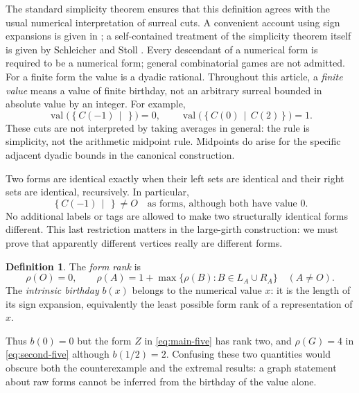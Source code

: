 \documentclass[11pt,a4paper]{article}
\numberwithin{equation}{section}
\theoremstyle{definition}
\newtheorem{definition}[theorem]{Definition}
\theoremstyle{remark}
\newcommand{\val}{\operatorname{val}}
\newcommand{\rk}{\rho}
\newcommand{\cut}[2]{\left\{#1\,\middle|\,#2\right\}}
\newcommand{\can}{C}
\begin{document}
The standard simplicity theorem ensures that this definition agrees with the
usual numerical interpretation of surreal cuts. A convenient account using
sign expansions is given in \cite[Sections~2--3]{Berarducci2020}; a self-contained
treatment of the simplicity theorem itself is given by Schleicher and Stoll
\cite[Section~5.1]{SchleicherStoll}. Every descendant of a numerical form is
required to be a numerical form; general combinatorial games are not admitted.
For a finite form the value is a dyadic rational. Throughout this article, a \emph{finite
value} means a value of finite birthday, not an arbitrary surreal bounded in
absolute value by an integer. For example,
\begin{equation}
 \val\bigl(\cut{\can(-1)}{}\bigr)=0,
 \qquad
 \val\bigl(\cut{\can(0)}{\can(2)}\bigr)=1.
\end{equation}
These cuts are not interpreted by taking averages in general: the rule is
simplicity, not the arithmetic midpoint rule. Midpoints do arise for the
specific adjacent dyadic bounds in the canonical construction.

Two forms are identical exactly when their left sets are identical and their
right sets are identical, recursively. In particular,
\begin{equation}
 \cut{\can(-1)}{}\ne O
 \quad\text{as forms, although both have value }0.
\end{equation}
No additional labels or tags are allowed to make two structurally identical
forms different. This last restriction matters in the large-girth construction:
we must prove that apparently different vertices really are different forms.

\begin{definition}
The \emph{form rank} is
\begin{equation}
 \rk(O)=0,\qquad
 \rk(A)=1+\max\{\rk(B):B\in L_A\cup R_A\}\quad(A\ne O).
\end{equation}
The \emph{intrinsic birthday} $b(x)$ belongs to the numerical value $x$: it is
the length of its sign expansion, equivalently the least possible form rank of
a representation of $x$.
\end{definition}

Thus $b(0)=0$ but the form $Z$ in \eqref{eq:main-five} has rank two, and
$\rk(G)=4$ in \eqref{eq:second-five} although $b(1/2)=2$. Confusing these two
quantities would obscure both the counterexample and the extremal results: a
graph statement about raw forms cannot be inferred from the birthday of the
value alone.
\end{document}
